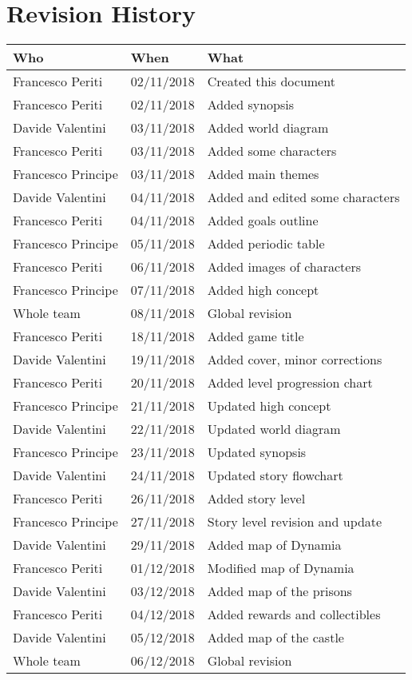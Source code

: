 \chapter*{Revision History}

\begin{longtable}[H]{|l|l|l|}
\hline
\cellcolor{lightgray}\textbf{Who} & \cellcolor{lightgray}\textbf{When} & \cellcolor{lightgray}\textbf{What} \\ \hline
Francesco Periti & 02/11/2018 & Created this document \\ \hline
Francesco Periti & 02/11/2018 & Added synopsis \\ \hline
Davide Valentini & 03/11/2018 & Added world diagram \\ \hline
Francesco Periti & 03/11/2018 & Added some characters \\ \hline
Francesco Principe & 03/11/2018 & Added main themes \\ \hline
Davide Valentini & 04/11/2018 & Added and edited some characters \\ \hline
Francesco Periti & 04/11/2018 & Added goals outline \\ \hline
Francesco Principe & 05/11/2018 & Added periodic table \\ \hline
Francesco Periti & 06/11/2018 & Added images of characters \\ \hline
Francesco Principe & 07/11/2018 & Added high concept \\ \hline
Whole team & 08/11/2018 & Global revision \\ \hline

Francesco Periti & 18/11/2018 & Added game title \\ \hline
Davide Valentini & 19/11/2018 & Added cover, minor corrections \\ \hline
Francesco Periti & 20/11/2018 & Added level progression chart \\ \hline
Francesco Principe & 21/11/2018 & Updated high concept \\ \hline
Davide Valentini & 22/11/2018 & Updated world diagram \\ \hline
Francesco Principe & 23/11/2018 & Updated synopsis \\ \hline
Davide Valentini & 24/11/2018 & Updated story flowchart \\ \hline
Francesco Periti & 26/11/2018 & Added story level \\ \hline
Francesco Principe & 27/11/2018 & Story level revision and update \\ \hline
Davide Valentini & 29/11/2018 & Added map of Dynamia \\ \hline
Francesco Periti & 01/12/2018 & Modified map of Dynamia \\ \hline
Davide Valentini & 03/12/2018 & Added map of the prisons \\ \hline
Francesco Periti & 04/12/2018 & Added rewards and collectibles \\ \hline
Davide Valentini & 05/12/2018 & Added map of the castle \\ \hline
Whole team & 06/12/2018 & Global revision \\ \hline


\end{longtable}
